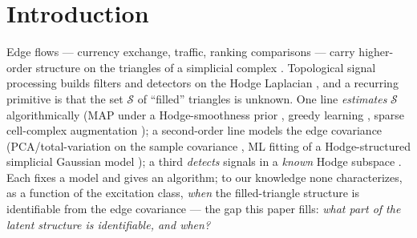 \documentclass{article}
\newcommand{\Scal}{\mathcal{S}}
\begin{document}
\section{Introduction}\label{sec:intro}
Edge flows --- currency exchange, traffic, ranking comparisons --- carry
higher-order structure on the triangles of a simplicial complex
\cite{barbarossa2020topological,schaub2021signal,lim2020hodge}. Topological
signal processing builds filters and detectors on the Hodge Laplacian
\cite{yang2022simplicial,battiloro2023topological,calmon2023dirac,%
marinucci2025topological,liu2024unrolling}, and a recurring primitive is that
the set $\Scal$ of ``filled'' triangles is unknown. One line \emph{estimates}
$\Scal$ algorithmically (MAP under a Hodge-smoothness prior
\cite{gurugubelli2024simplicial}, greedy learning \cite{buciulea2025learning},
sparse cell-complex augmentation \cite{hoppe2023representing}); a second-order
line models the edge covariance (PCA/total-variation on the sample covariance
\cite[\S VII]{barbarossa2020topological}, ML fitting of a Hodge-structured
simplicial Gaussian model \cite{marinucci2025simplicial}); a third
\emph{detects} signals in a \emph{known} Hodge subspace \cite{liu2025matched}.
Each fixes a model and gives an algorithm; to our knowledge none characterizes,
as a function of the excitation class, \emph{when} the filled-triangle
structure is identifiable from the edge covariance --- the gap this paper
fills: \emph{what part of the latent structure is identifiable, and when?}
\end{document}
